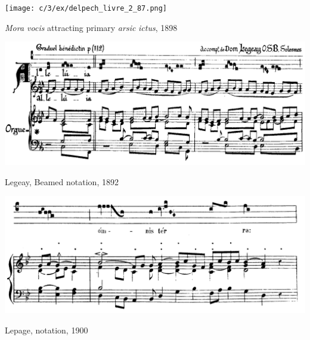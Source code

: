 \vspace*{\fill}

\begin{example}
  \centering
  \texttt{[image: c/3/ex/delpech\_livre\_2\_87.png]}
  \caption{\emph{Mora vocis} attracting primary \emph{arsic} \emph{ictus}, 1898}
  \label{mus:delpech_livre_2_87}
\end{example}

\vspace*{\fill}

\begin{landscape}

 \vspace*{\fill}

  \begin{example}
    \centering
    \includegraphics[width=.8\linewidth]{c/3/ex/legeay_4_14.png}
    \caption{Legeay, Beamed notation, 1892}
    \label{mus:legeay_4_14}
  \end{example}

  \vspace*{\fill}

\end{landscape}

\vspace*{\fill}

\begin{example}
  \centering
  \includegraphics[width=\linewidth]{c/3/ex/lepage_85.jpg}
  \caption{Lepage, \ldo{} notation, 1900}
  \label{mus:lepage_85}
\end{example}

\vspace*{\fill}

